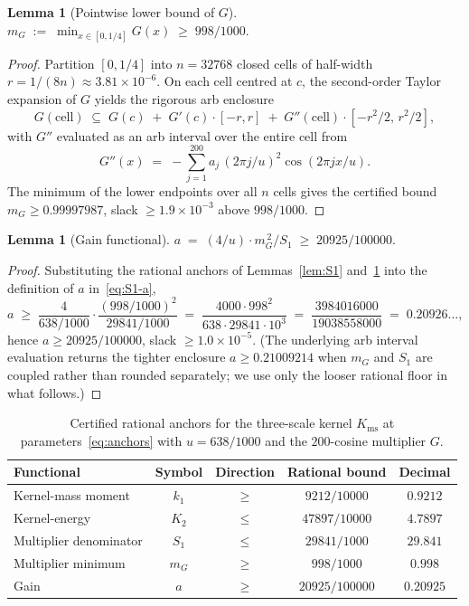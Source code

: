\documentclass[11pt, letterpaper]{article}
\theoremstyle{plain}
\newtheorem{lemma}[theorem]{Lemma}
\theoremstyle{definition}
\newcommand{\Kms}{K_{\mathrm{ms}}}
\begin{document}
\begin{lemma}[Pointwise lower bound of $G$]
\label{lem:mG}
\(
  m_G \;:=\; \min_{x\in[0,1/4]}G(x) \;\ge\; 998/1000.
\)
\end{lemma}

\begin{proof}
Partition $[0,1/4]$ into $n=32768$ closed cells of half-width
$r=1/(8n)\approx 3.81\times 10^{-6}$.  On each cell centred at $c$,
the second-order Taylor expansion of $G$ yields the rigorous arb
enclosure
\[
  G(\mathrm{cell})\;\subseteq\;
    G(c)\;+\;G'(c)\cdot[-r,r]\;+\;G''(\mathrm{cell})\cdot[-r^{2}/2,\,r^{2}/2],
\]
with $G''$ evaluated as an arb interval over the entire cell from
\[
  G''(x) \;=\; -\sum_{j=1}^{200}a_j\,(2\pi j/u)^{2}\cos(2\pi jx/u).
\]
The minimum of the lower endpoints over all $n$ cells gives the
certified bound $m_G\ge 0.99997987$, slack $\ge 1.9\times 10^{-3}$
above $998/1000$.
\end{proof}

\begin{lemma}[Gain functional]
\label{lem:a}
\(
  a \;=\; (4/u)\cdot m_G^{\,2}/S_1 \;\ge\; 20925/100000.
\)
\end{lemma}

\begin{proof}
Substituting the rational anchors of
Lemmas~\ref{lem:S1} and~\ref{lem:mG} into the definition of $a$
in~\eqref{eq:S1-a},
\[
  a
  \;\ge\;
  \frac{4}{638/1000}\cdot\frac{(998/1000)^{2}}{29841/1000}
  \;=\;
  \frac{4000\cdot 998^{2}}{638\cdot 29841\cdot 10^{3}}
  \;=\;
  \frac{3984016000}{19038558000}
  \;=\; 0.20926\ldots,
\]
hence $a\ge 20925/100000$, slack $\ge 1.0\times 10^{-5}$.  (The
underlying arb interval evaluation returns the tighter enclosure
$a\ge 0.21009214$ when $m_G$ and $S_1$ are coupled rather than
rounded separately; we use only the looser rational floor in what
follows.)
\end{proof}

\begin{table}[ht]
\centering
\begin{tabular}{lcccc}
  \toprule
  Functional & Symbol & Direction & Rational bound & Decimal \\
  \midrule
  Kernel-mass moment   & $k_1$ & $\ge$ & $9212/10000$    & $0.9212$ \\
  Kernel-energy        & $K_2$ & $\le$ & $47897/10000$   & $4.7897$ \\
  Multiplier denominator & $S_1$ & $\le$ & $29841/1000$  & $29.841$ \\
  Multiplier minimum   & $m_G$ & $\ge$ & $998/1000$      & $0.998$  \\
  Gain                 & $a$   & $\ge$ & $20925/100000$  & $0.20925$ \\
  \bottomrule
\end{tabular}
\caption{Certified rational anchors for the three-scale kernel
$\Kms$ at parameters~\eqref{eq:anchors} with $u=638/1000$ and the
$200$-cosine multiplier $G$.}
\label{tab:anchors}
\end{table}
\end{document}
